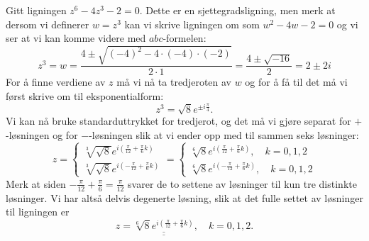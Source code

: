 \documentclass[a4paper,norsk,12pt]{article}
\newcommand{\ans}[1]{\underline{\underline{#1}}}
\newcounter{exa}
\begin{document}
\begin{texample}
Gitt ligningen $z^6 - 4z^3 - 2=0$. Dette er en sjettegradsligning, men merk at dersom vi definerer $w=z^3$ kan vi skrive ligningen om som $w^2 - 4w - 2=0$ og vi ser at vi kan komme videre med $abc$-formelen:
\begin{displaymath}
	z^3 = w = \frac{4\pm\sqrt{(-4)^2-4\cdot(-4)\cdot(-2)}}{2\cdot1} = \frac{4\pm\sqrt{-16}}{2} = 2\pm2i
\end{displaymath}
For å finne verdiene av $z$ må vi nå ta tredjeroten av $w$ og for å få til det må vi først skrive om til eksponentialform:
\begin{displaymath}
	z^3 = \sqrt{8}e^{\pm i\frac{\pi}{4}}.
\end{displaymath}
Vi kan nå bruke standarduttrykket for tredjerot, og det må vi gjøre separat for $+$-løsningen og for $-$-løsningen slik at vi ender opp med til sammen seks løsninger:
\begin{displaymath}
	z = \begin{cases}
		\sqrt[3]{\sqrt{8}}e^{i\left(\frac{\pi}{12} + \frac{\pi}{6}k\right)} \\
		\sqrt[3]{\sqrt{8}}e^{i\left(-\frac{\pi}{12} + \frac{\pi}{6}k\right)}
	\end{cases}
	= \begin{cases}
		\sqrt[6]{8}e^{i\left(\frac{\pi}{12} + \frac{\pi}{6}k\right)}, \quad k=0, 1, 2 \\
		\sqrt[6]{8}e^{i\left(-\frac{\pi}{12} + \frac{\pi}{6}k\right)}, \quad k = 0, 1, 2
	\end{cases}
\end{displaymath}
Merk at siden $-\frac{\pi}{12} + \frac{\pi}{6} = \frac{\pi}{12}$ svarer de to settene av løsninger til kun tre distinkte løsninger. Vi har altså delvis degenerte løsning, slik at det fulle settet av løsninger til ligningen er 
\begin{displaymath}
	z = \ans{\sqrt[6]{8}e^{i\left(\frac{\pi}{12} + \frac{\pi}{6}k\right)}}, \quad k=0, 1, 2.
\end{displaymath}
\end{texample}

\newpage
\end{document}
